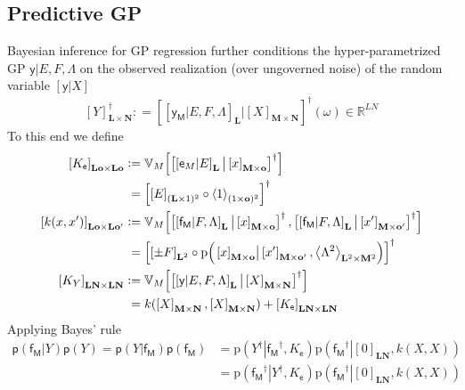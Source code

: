 \documentclass[preprint,12pt]{elsarticle}
\newcommand*{\M}[1]{\ensuremath{#1}\xspace}
\newcommand*{\x}{\times}
\newcommand*{\mi}[1]{\mathbf{#1}}
\newcommand*{\st}[1]{\mathbb{#1}}
\newcommand*{\rv}[1]{\mathsf{#1}}
\newcommand*{\te}[2][]{\left\lbrack{#2}\right\rbrack_{#1}}
\newcommand*{\diag}[2][]{\left\langle{#2}\right\rangle_{#1}}
\newcommand*{\prob}[3]{\M{\mathrm{p}\!\left(\left.{#1}\right\vert{#2,#3}\right)}}
\newcommand*{\deq}{\M{\mathrel{\mathop:}=}}
\newcommand*{\cov}[3][]{\ifthenelse{\equal{#1}{}}{\mathbb{V}_{#3}\!\left\lbrack{#2}\right\rbrack}{\mathbb{V}_{#3}\!\left\lbrack{#2,#1}\right\rbrack}}
\begin{document}
    \subsection{Predictive GP} \label{sub:GPR:Predictive}
        Bayesian inference for GP regression further conditions the hyper-parametrized GP $\rv{y} \vert E,F,\Lambda$ on the observed realization (over ungoverned noise) of the random variable $\te{\rv{y}\vert X}$
        \begin{equation*}
            \te[\mi{L} \x \mi{N}]{Y}^{\dagger} \deq \te{\te[\mi{L}]{\rv{y_M}\vert E,F,\Lambda} \big\vert \te[\mi{M}\x\mi{N}]{X}}^{\dagger}\!(\omega) \in \st{R}^{LN}
        \end{equation*}
        To this end we define
        \begin{equation} \label{def:GPR:Kk}
            \begin{aligned}
                \te[\mi{Lo}\x\mi{Lo}]{K_{\rv{e}}} &\deq 
                \cov{\te{\te[\mi{L}]{\rv{e}_{M}\vert E} \big\vert \te[\mi{M}\x\mi{o}]{x}}^{\dagger}}{M} \\
                &\phantom{:}= \te{\te[(\mi{L}\x 1)^2]{E} \circ \diag[(1\x\mi{o})^2]{1}}^{\dagger} \\
                \te[\mi{Lo}\x\mi{L o^{\prime}}]{k(x, x^{\prime})} &\deq
                \cov[{\te{\te[\mi{L}]{\rv{f_M}\vert F,\Lambda} \big\vert \te[\mi{M}\x\mi{o^{\prime}}]{x^{\prime}}}^{\dagger}}]
                {\te{\te[\mi{L}]{\rv{f_M}\vert F,\Lambda} \big\vert \te[\mi{M}\x\mi{o}]{x}}^{\dagger}}{M} \\
                &\phantom{:}= \te{\te[\mi{L}^{2}]{\pm F} \circ 
                \prob{\te[\mi{M}\x\mi{o}]{x}}{\te[\mi{M}\x\mi{o^{\prime}}]{x^{\prime}}}
                {\diag[\mi{L}^{2}\x\mi{M}^{2}]{\Lambda^{2}}}}^{\dagger} \\
                \te[\mi{LN}\x\mi{LN}]{K_{Y}} &\deq 
                \cov{\te{\te[\mi{L}]{\rv{y}\vert E,F,\Lambda} \big\vert \te[\mi{M}\x\mi{N}]{X}}^{\dagger}}{M} \\
                &\phantom{:}= k(\te[\mi{M}\x\mi{N}]{X},\te[\mi{M}\x\mi{N}]{X}) + \te[\mi{LN}\x\mi{LN}]{K_{\rv{e}}}
            \end{aligned}
        \end{equation}
        Applying Bayes' rule
        \begin{equation*}
            \begin{aligned}
                \mathsf{p}(\rv{f_M}\vert Y)\mathsf{p}(Y) = \mathsf{p}(Y\vert \rv{f_M})\mathsf{p}(\rv{f_M})
                &= \prob{Y^{\dagger}}{\rv{f_M}^{\dagger}}{K_{\rv{e}}} \prob{\rv{f_M}^{\dagger}}{\te[\mi{LN}]{0}}{k(X,X)} \\
                &= \prob{\rv{f_M}^{\dagger}}{Y^{\dagger}}{K_{\rv{e}}} \prob{\rv{f_M}^{\dagger}}{\te[\mi{LN}]{0}}{k(X,X)}
            \end{aligned}
        \end{equation*}
\end{document}

